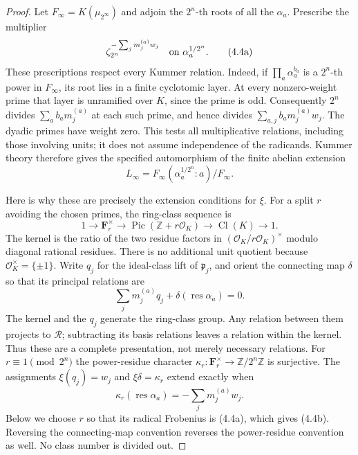 \documentclass[11pt]{article}
\theoremstyle{definition}
\theoremstyle{remark}
\newcommand{\Z}{\mathbb Z}
\begin{document}
\begin{proof}
Let $F_\infty=K(\mu_{2^\infty})$ and adjoin the $2^n$-th roots of
all the $\alpha_a$. Prescribe the multiplier
\[
 \zeta_{2^n}^{-\sum_jm_j^{(a)}w_j}
 \quad\hbox{on }\alpha_a^{1/2^n}.                              \tag{4.4a}
\]
These prescriptions respect every Kummer relation. Indeed, if
$\prod_a\alpha_a^{b_a}$ is a $2^n$-th power in $F_\infty$, its
root lies in a finite cyclotomic layer. At every nonzero-weight
prime that layer is unramified over $K$, since the prime is odd.
Consequently $2^n$ divides $\sum_ab_am_j^{(a)}$ at each such prime,
and hence divides $\sum_{a,j}b_am_j^{(a)}w_j$. The dyadic primes
have weight zero. This tests all multiplicative relations, including
those involving units; it does not assume independence of the
radicands. Kummer theory therefore gives the specified automorphism
of the finite abelian extension
\[
 L_\infty=F_\infty(\alpha_a^{1/2^n}:a)/F_\infty.
\]

Here is why these are precisely the extension conditions for $\xi$.
For a split $r$ avoiding the chosen primes, the ring-class sequence is
\[
 1\longrightarrow\mathbf F_r^\times
 \longrightarrow\operatorname{Pic}(\Z+r\mathcal O_K)
 \longrightarrow\operatorname{Cl}(K)\longrightarrow1.
\]
The kernel is the ratio of the two residue factors in
$(\mathcal O_K/r\mathcal O_K)^\times$ modulo diagonal rational
residues. There is no additional unit quotient because
$\mathcal O_K^\times=\{\pm1\}$. Write $q_j$ for the ideal-class
lift of $\mathfrak p_j$, and orient the connecting map $\delta$ so
that its principal relations are
\[
 \sum_jm_j^{(a)}q_j+\delta(\operatorname{res}\alpha_a)=0.
\]
The kernel and the $q_j$ generate the ring-class group. Any relation
between them projects to $\mathcal R$; subtracting its basis
relations leaves a relation within the kernel. Thus these are a
complete presentation, not merely necessary relations.
For $r\equiv1\pmod{2^n}$ the power-residue character
$\kappa_r:\mathbf F_r^\times\to\Z/2^n\Z$ is surjective.
The assignments $\xi(q_j)=w_j$ and $\xi\delta=\kappa_r$ extend
exactly when
\[
 \kappa_r(\operatorname{res}\alpha_a)
       =-\sum_jm_j^{(a)}w_j.                                  \tag{4.4b}
\]
Below we choose $r$ so that its radical Frobenius is (4.4a), which
gives (4.4b). Reversing the connecting-map convention reverses the
power-residue convention as well. No class number is divided out.


\end{proof}
\end{document}
